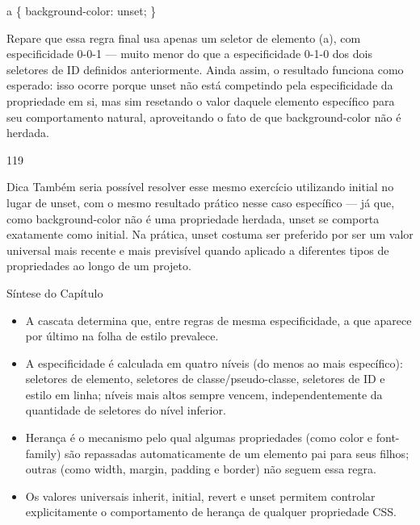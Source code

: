 a \{ background-color: unset; \}

Repare que essa regra final usa apenas um seletor de elemento (a), com especificidade 0-0-1 — muito menor do que a especificidade 0-1-0 dos dois seletores de ID definidos anteriormente. Ainda assim, o resultado funciona como esperado: isso ocorre porque unset não está competindo pela especificidade da propriedade em si, mas sim resetando o valor daquele elemento específico para seu comportamento natural, aproveitando o fato de que background-color não é herdada.

119

\begin{infobox}{Dica}
Também seria possível resolver esse mesmo exercício utilizando initial no lugar de unset, com o mesmo resultado prático nesse caso específico — já que, como background-color não é uma propriedade herdada, unset se comporta exatamente como initial. Na prática, unset costuma ser preferido por ser um valor universal mais recente e mais previsível quando aplicado a diferentes tipos de propriedades ao longo de um projeto.
\end{infobox}

Síntese do Capítulo

\begin{itemize}
  \item A cascata determina que, entre regras de mesma especificidade, a que aparece por último na folha de estilo prevalece.
\end{itemize}

\begin{itemize}
  \item A especificidade é calculada em quatro níveis (do menos ao mais específico): seletores de elemento, seletores de classe/pseudo-classe, seletores de ID e estilo em linha; níveis mais altos sempre vencem, independentemente da quantidade de seletores do nível inferior.
\end{itemize}

\begin{itemize}
  \item Herança é o mecanismo pelo qual algumas propriedades (como color e font-family) são repassadas automaticamente de um elemento pai para seus filhos; outras (como width, margin, padding e border) não seguem essa regra.
\end{itemize}

\begin{itemize}
  \item Os valores universais inherit, initial, revert e unset permitem controlar explicitamente o comportamento de herança de qualquer propriedade CSS.
\end{itemize}

